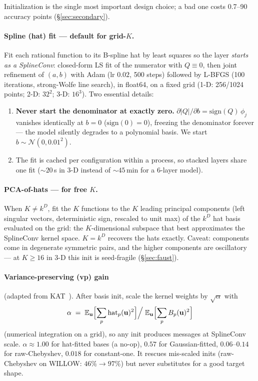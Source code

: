 \documentclass[11pt]{article}
\newcommand{\bu}{\mathbf{u}}
\newcommand{\E}{\mathbb{E}}
\begin{document}
Initialization is the single most important design choice; a bad one costs
0.7--90 accuracy points (\S\ref{sec:secondary}).

\paragraph{Spline (hat) fit --- default for grid-$K$.} Fit each rational
function to its B-spline hat by least squares so the layer \emph{starts as a
SplineConv}: closed-form LS fit of the numerator with $Q\equiv 0$, then joint
refinement of $(a,b)$ with Adam (lr $0.02$, 500 steps) followed by L-BFGS
(100 iterations, strong-Wolfe line search), in float64, on a fixed grid (1-D:
256/1024 points; 2-D: $32^2$; 3-D: $16^3$). Two essential details:
\begin{enumerate}
\item \textbf{Never start the denominator at exactly zero.}
  $\partial|Q|/\partial b = \mathrm{sign}(Q)\,\phi_j$ vanishes identically at
  $b=0$ ($\mathrm{sign}(0)=0$), freezing the denominator forever --- the
  model silently degrades to a polynomial basis. We start
  $b \sim \mathcal N(0, 0.01^2)$.
\item The fit is cached per configuration within a process, so stacked layers
  share one fit (${\sim}20$\,s in 3-D instead of ${\sim}45$\,min for a
  6-layer model).
\end{enumerate}

\paragraph{PCA-of-hats --- for free $K$.} When $K \ne k^D$, fit the $K$
functions to the $K$ leading principal components (left singular vectors,
deterministic sign, rescaled to unit max) of the $k^D$ hat basis evaluated on
the grid: the $K$-dimensional subspace that best approximates the SplineConv
kernel space. $K=k^D$ recovers the hats exactly. Caveat: components come in
degenerate symmetric pairs, and the higher components are oscillatory --- at
$K\ge 16$ in 3-D this init is seed-fragile (\S\ref{sec:faust}).

\paragraph{Variance-preserving (vp) gain} (adapted from
KAT~\cite{yang2025kat}). After basis init, scale the kernel weights by
$\sqrt{\alpha}$ with
\begin{equation}
\alpha \;=\;
\E_{\bu}\Bigl[\sum_p \mathrm{hat}_p(\bu)^2\Bigr] \Big/\;
\E_{\bu}\Bigl[\sum_p B_p(\bu)^2\Bigr]
\label{eq:vp}
\end{equation}
(numerical integration on a grid), so any init produces messages at
SplineConv scale. $\alpha \approx 1.00$ for hat-fitted bases (a no-op),
$0.57$ for Gaussian-fitted, $0.06$--$0.14$ for raw-Chebyshev, $0.018$ for
constant-one. It rescues mis-scaled inits (raw-Chebyshev on WILLOW:
$46\% \to 97\%$) but never substitutes for a good target shape.
\end{document}
